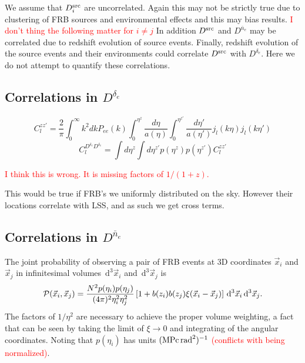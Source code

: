 \documentclass[onecolumn,prd,noshowpacs,nofootinbib,amsmath,amssymb]{revtex4}
\newcommand{\Dne}{D^{\bar{n}_e}}
\newcommand{\Dde}{D^{\delta_e}}
\newcommand{\Dsrc}{D^{\rm src}}
\newcommand{\calP}{{\cal P}}
\newcommand{\ud}{\,\mathrm{d}}
\newcommand{\red}{\textcolor{red}}
\begin{document}
We assume that $D^{\rm src}_i$ are uncorrelated. Again this may not
be strictly true due to clustering of FRB sources and environmental effects
and this may bias results.  \red{I don't thing the following matter for $i \neq
j$} In addition $\Dsrc$ and $\Dne$ may be correlated due
to redshift evolution of source events. Finally, redshift evolution of the
source events and their environments could correlate $\Dsrc$ with $\Dde$. Here
we do not attempt to quantify these correlations.


\subsection{Correlations in $\Dde$}

\begin{equation}
C_l^{zz'}=\frac{2}{\pi} \int_0^{\infty}k^2 dk P_{ee}(k) \int_0^{\eta^z}\frac{d\eta}{a(\eta)} \int_0^{\eta^{z'}}\frac{d\eta'}{a(\eta')}  j_l(k\eta) j_l(k\eta')
\end{equation}
\begin{equation}
C_l^{\Dde \Dde} = \int d\eta^z \int d\eta^{z'} p(\eta^z)p(\eta^{z'}) C_l^{z z'}
\end{equation}

\red{I think this is wrong. It is missing factors of $1/(1+z)$.}

This would be true if FRB's we uniformly distributed on the sky.  However their
locations correlate with LSS, and as such we get cross terms.

\subsection{Correlations in $\Dne$}


The joint probability of observing a pair of FRB events at 3D coordinates
$\vec x_i$ and $\vec x_j$ in infinitesimal volumes $\ud^3\vec x_i$ and
$\ud^3\vec x_j$ is
\begin{equation}
    \calP(\vec x_i, \vec x_j) =
    \frac{N^2 p(\eta_i) p(\eta_j)}{(4 \pi)^2 \eta_i^2 \eta_j^2}
    \left[ 1 + b(z_i) b(z_j) \xi(\vec x_i - \vec x_j) \right]
    \ud^3\vec x_i \ud^3\vec x_j.
\end{equation}
The factors of $1/\eta^2$ are necessary to achieve the proper volume weighting,
a fact that can be seen by taking the limit of $\xi \to 0$ and integrating of
the angular coordinates. Noting that $p(\eta_i)$ has units 
\red{$({\rm MPc}\,{\rm rad}^2)^{-1}$ (conflicts with being normalized)}.
\end{document}
